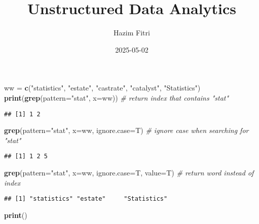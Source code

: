 \documentclass[
]{article}
\title{Unstructured Data Analytics}
\author{Hazim Fitri}
\date{2025-05-02}
\newenvironment{Shaded}{\begin{snugshade}}{\end{snugshade}}
\newcommand{\AttributeTok}[1]{\textcolor[rgb]{0.13,0.29,0.53}{#1}}
\newcommand{\CommentTok}[1]{\textcolor[rgb]{0.56,0.35,0.01}{\textit{#1}}}
\newcommand{\FunctionTok}[1]{\textcolor[rgb]{0.13,0.29,0.53}{\textbf{#1}}}
\newcommand{\NormalTok}[1]{#1}
\newcommand{\OtherTok}[1]{\textcolor[rgb]{0.56,0.35,0.01}{#1}}
\newcommand{\StringTok}[1]{\textcolor[rgb]{0.31,0.60,0.02}{#1}}
\begin{document}
\maketitle

\begin{Shaded}
\begin{Highlighting}[]
\NormalTok{ww }\OtherTok{=} \FunctionTok{c}\NormalTok{(}\StringTok{"statistics"}\NormalTok{, }\StringTok{"estate"}\NormalTok{, }\StringTok{"castrate"}\NormalTok{, }\StringTok{"catalyst"}\NormalTok{, }\StringTok{"Statistics"}\NormalTok{)}
\FunctionTok{print}\NormalTok{(}\FunctionTok{grep}\NormalTok{(}\AttributeTok{pattern=}\StringTok{"stat"}\NormalTok{, }\AttributeTok{x=}\NormalTok{ww)) }\CommentTok{\# return index that contains "stat"}
\end{Highlighting}
\end{Shaded}

\begin{verbatim}
## [1] 1 2
\end{verbatim}

\begin{Shaded}
\begin{Highlighting}[]
\FunctionTok{grep}\NormalTok{(}\AttributeTok{pattern=}\StringTok{"stat"}\NormalTok{, }\AttributeTok{x=}\NormalTok{ww, }\AttributeTok{ignore.case=}\NormalTok{T) }\CommentTok{\# ignore case when searching for "stat"}
\end{Highlighting}
\end{Shaded}

\begin{verbatim}
## [1] 1 2 5
\end{verbatim}

\begin{Shaded}
\begin{Highlighting}[]
\FunctionTok{grep}\NormalTok{(}\AttributeTok{pattern=}\StringTok{"stat"}\NormalTok{, }\AttributeTok{x=}\NormalTok{ww, }\AttributeTok{ignore.case=}\NormalTok{T, }\AttributeTok{value=}\NormalTok{T) }\CommentTok{\# return word instead of index}
\end{Highlighting}
\end{Shaded}

\begin{verbatim}
## [1] "statistics" "estate"     "Statistics"
\end{verbatim}

\begin{Shaded}
\begin{Highlighting}[]
\FunctionTok{print}\NormalTok{(}\StringTok{\textquotesingle{}{-}{-}{-}{-}{-}{-}{-}{-}{-}{-}{-}{-}{-}{-}{-}{-}{-}{-}{-}{-}\textquotesingle{}}\NormalTok{)}
\end{Highlighting}
\end{Shaded}
\end{document}
